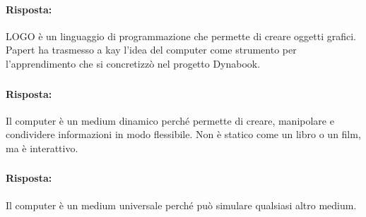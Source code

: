 
\paragraph{Risposta:} LOGO è un linguaggio di programmazione che permette di creare oggetti grafici.
Papert ha trasmesso a kay l'idea del computer come strumento per l'apprendimento che si 
concretizzò nel progetto Dynabook.

\subsubsection{}


\paragraph{Risposta:} Il computer è un medium dinamico perché permette di creare, manipolare e condividere informazioni in modo flessibile.
Non è statico come un libro o un film, ma è interattivo.

\subsubsection{}


\paragraph{Risposta:} Il computer è un medium universale perché può simulare 
qualsiasi altro medium.

